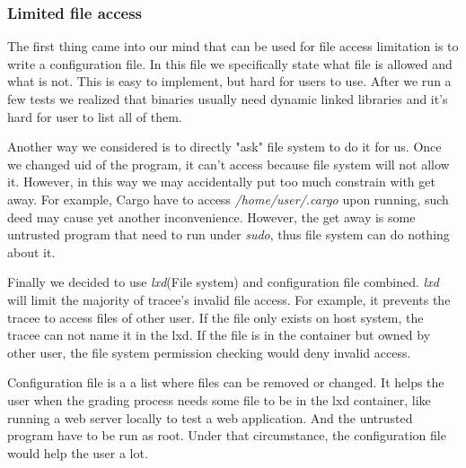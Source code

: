 \documentclass[conference,compsoc]{IEEEtran}
\begin{document}
		\subsubsection{Limited file access}
			\par
				The first thing came into our mind that can be used for file access limitation is to write a configuration file.
				In this file we specifically state what file is allowed and what is not.
				This is easy to implement, but hard for users to use. 
				After we run a few tests we realized that binaries usually need dynamic linked libraries and it's hard for user to list all of them.
			\par 
				Another way we considered is to directly "ask" file system to do it for us.
				Once we changed uid of the program, it can't access because file system will not allow it.
				However, in this way we may accidentally put too much constrain with get away.
				For example, Cargo have to access \emph{ /home/user/.cargo } upon running, such deed may cause yet another inconvenience. 
				However, the get away is some untrusted program that need to run under \emph{sudo}, thus file system can do nothing about it.
			\par 	
				Finally we decided to use \emph{lxd}(File system) and configuration file combined.
				\emph{lxd} will limit the majority of tracee's invalid file access. 
				For example, it prevents the tracee to access files of other user. 
				If the file only exists on host system, the tracee can not name it in the lxd. 
				If the file is in the container but owned by other user, the file system permission checking would deny invalid access.
				\par
				Configuration file is a a list where files can be removed or changed. 
				It helps the user when the grading process needs some file to be in the lxd container, like running a web server locally to test a web application. 
				And the untrusted program have to be run as root. 
				Under that circumstance, the configuration file would help the user a lot.
		\par
\end{document}
